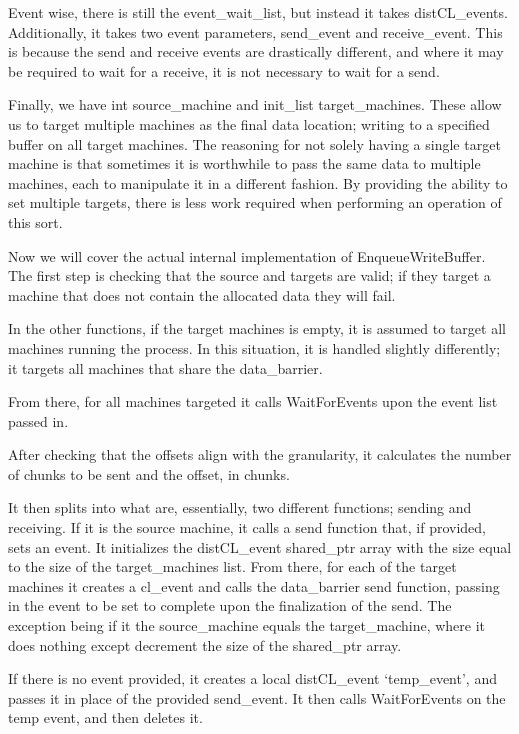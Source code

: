 \documentclass[../thesis.tex]{subfiles}
\begin{document}
            Event wise, there is still the event\_wait\_list, but instead it takes distCL\_events. Additionally, it takes two event parameters, send\_event and receive\_event. This is because the send and receive events are drastically different, and where it may be required to wait for a receive, it is not necessary to wait for a send.

            Finally, we have int source\_machine and init\_list target\_machines. These allow us to target multiple machines as the final data location; writing to a specified buffer on all target machines. The reasoning for not solely having a single target machine is that sometimes it is worthwhile to pass the same data to multiple machines, each to manipulate it in a different fashion. By providing the ability to set multiple targets, there is less work required when performing an operation of this sort.

            Now we will cover the actual internal implementation of EnqueueWriteBuffer. The first step is checking that the source and targets are valid; if they target a machine that does not contain the allocated data they will fail. 

            In the other functions, if the target machines is empty, it is assumed to target all machines running the process. In this situation, it is handled slightly differently; it targets all machines that share the data\_barrier.

            From there, for all machines targeted it calls WaitForEvents upon the event list passed in.

            After checking that the offsets align with the granularity, it calculates the number of chunks to be sent and the offset, in chunks.

            It then splits into what are, essentially, two different functions; sending and receiving. If it is the source machine, it calls a send function that, if provided, sets an event. It initializes the distCL\_event shared\_ptr array with the size equal to the size of the target\_machines list. From there, for each of the target machines it creates a cl\_event and calls the data\_barrier send function, passing in the event to be set to complete upon the finalization of the send. The exception being if it the source\_machine equals the target\_machine, where it does nothing except decrement the size of the shared\_ptr array.

            If there is no event provided, it creates a local distCL\_event `temp\_event', and passes it in place of the provided send\_event. It then calls WaitForEvents on the temp event, and then deletes it.
\end{document}

